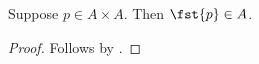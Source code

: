 

\begin{classification}\label{notion_first_projection_repeated_variable}
    Suppose $p\in A\times A$.
    Then $\fst{p}\in A$.
\end{classification}
\begin{proof}
    Follows by .
\end{proof}
